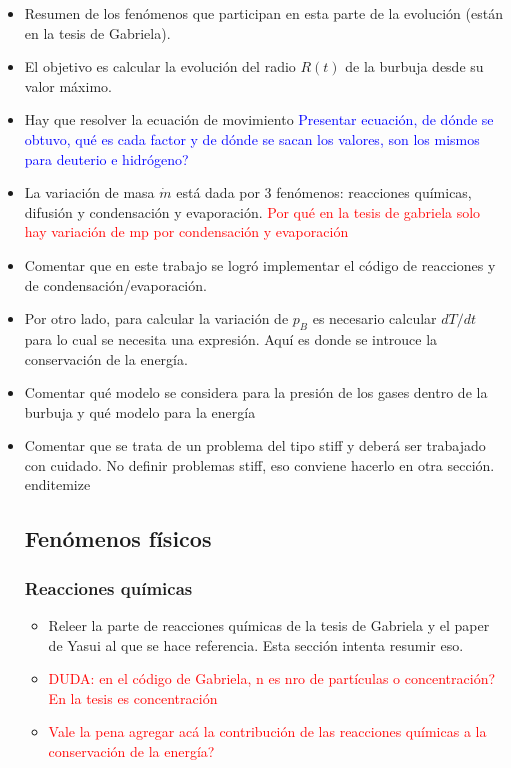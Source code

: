 \documentclass[aps,prb,twocolumn,superscriptaddress,floatfix,longbibliography,10pt]{revtex4-2}
\newcounter{para}
\begin{document}
\begin{itemize}
  \item Resumen de los fenómenos que participan en esta parte de la evolución (están en la tesis de Gabriela).
  \item El objetivo es calcular la evolución del radio $R(t)$ de la burbuja desde su valor máximo.
  \item Hay que resolver la ecuación de movimiento \textcolor{blue}{Presentar ecuación, de dónde se obtuvo, qué es cada factor y de dónde se sacan los valores, son los mismos para deuterio e hidrógeno?}
  \item La variación de masa $\dot{m}$ está dada por 3 fenómenos: reacciones químicas, difusión y condensación y evaporación. \textcolor{red}{Por qué en la tesis de gabriela solo hay variación de mp por condensación y evaporación}
  \item Comentar que en este trabajo se logró implementar el código de reacciones y de condensación/evaporación.
  \item Por otro lado, para calcular la variación de $p_B$ es necesario calcular $dT/dt$ para lo cual se necesita una expresión. Aquí es donde se introuce la conservación de la energía.
  \item Comentar qué modelo se considera para la presión de los gases dentro de la burbuja y qué modelo para la energía
  \item Comentar que se trata de un problema del tipo stiff y deberá ser trabajado con cuidado. No definir problemas stiff, eso conviene hacerlo en otra sección.
end{itemize}

\subsection{Fenómenos físicos}

\subsubsection{Reacciones químicas}
\begin{itemize}
  \item Releer la parte de reacciones químicas de la tesis de Gabriela y el paper de Yasui al que se hace referencia. Esta sección intenta resumir eso.
  \item \textcolor{red}{DUDA: en el código de Gabriela, n es nro de partículas o concentración? En la tesis es concentración}
  \item \textcolor{red}{Vale la pena agregar acá la contribución de las reacciones químicas a la conservación de la energía?}
\end{itemize}



\end{itemize}
\end{document}
